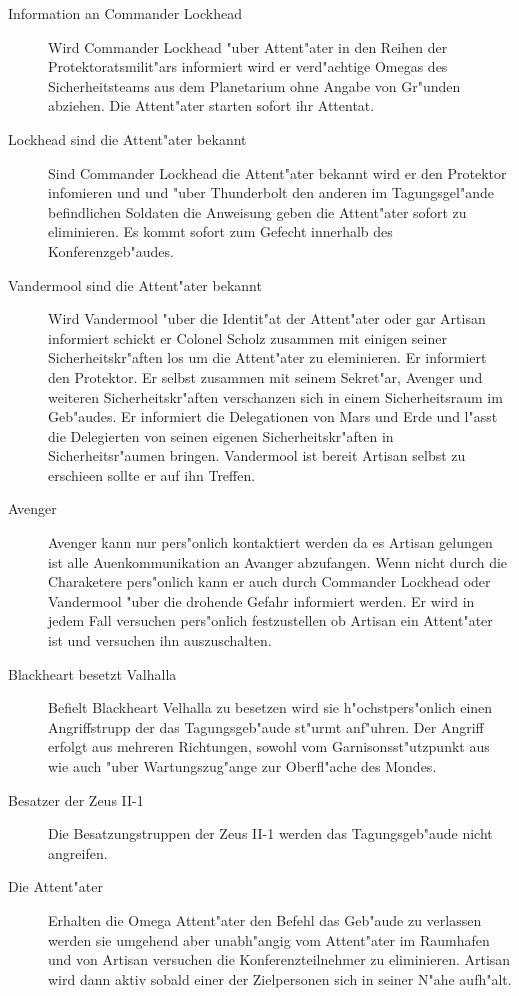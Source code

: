\begin{description}
	\item[Information an Commander Lockhead] Wird Commander Lockhead "uber Attent"ater in den Reihen der Protektoratsmilit"ars informiert 
		wird er verd"achtige Omegas des Sicherheitsteams aus dem Planetarium ohne Angabe von Gr"unden abziehen. Die Attent"ater starten sofort ihr Attentat.
	\item[Lockhead sind die Attent"ater bekannt] Sind Commander Lockhead die Attent"ater bekannt wird er den Protektor infomieren und 
		und "uber Thunderbolt den anderen im Tagungsgel"ande befindlichen Soldaten die Anweisung geben die Attent"ater sofort zu eliminieren. Es kommt sofort zum Gefecht innerhalb des Konferenzgeb"audes.
	\item[Vandermool sind die Attent"ater bekannt] Wird Vandermool "uber die Identit"at der Attent"ater oder gar Artisan informiert schickt 	er Colonel Scholz zusammen mit einigen seiner Sicherheitskr"aften los um die Attent"ater zu eleminieren. Er informiert den 
		Protektor. Er selbst zusammen mit seinem Sekret"ar, Avenger und weiteren Sicherheitskr"aften verschanzen sich in einem Sicherheitsraum im Geb"audes. Er informiert die Delegationen von Mars und Erde und l"asst die Delegierten von seinen eigenen Sicherheitskr"aften in Sicherheitsr"aumen bringen. Vandermool ist bereit Artisan selbst zu erschie\3en sollte er auf ihn Treffen.
	\item[Avenger] Avenger kann nur pers"onlich kontaktiert werden da es Artisan gelungen ist alle Au\3enkommunikation an Avanger 	
		abzufangen. Wenn nicht durch die Charaketere pers"onlich kann er auch durch Commander Lockhead oder Vandermool "uber die drohende Gefahr informiert werden. Er wird in jedem Fall versuchen pers"onlich festzustellen ob Artisan ein Attent"ater ist und versuchen ihn auszuschalten.
	\item[Blackheart besetzt Valhalla] Befielt Blackheart Velhalla zu besetzen wird sie h"ochstpers"onlich einen Angriffstrupp der das 
		Tagungsgeb"aude st"urmt anf"uhren. Der Angriff erfolgt aus mehreren Richtungen, sowohl vom Garnisonsst"utzpunkt aus wie auch "uber Wartungszug"ange zur Oberfl"ache des Mondes.
	\item[Besatzer der Zeus II-1] Die Besatzungstruppen der Zeus II-1 werden das Tagungsgeb"aude nicht angreifen.
	\item[Die Attent"ater] Erhalten die Omega Attent"ater den Befehl das Geb"aude zu verlassen werden sie umgehend aber unabh"angig vom 
		Attent"ater im Raumhafen und von Artisan versuchen die Konferenzteilnehmer zu eliminieren. Artisan wird dann aktiv sobald einer der Zielpersonen sich in seiner N"ahe aufh"alt.
\end{description}

